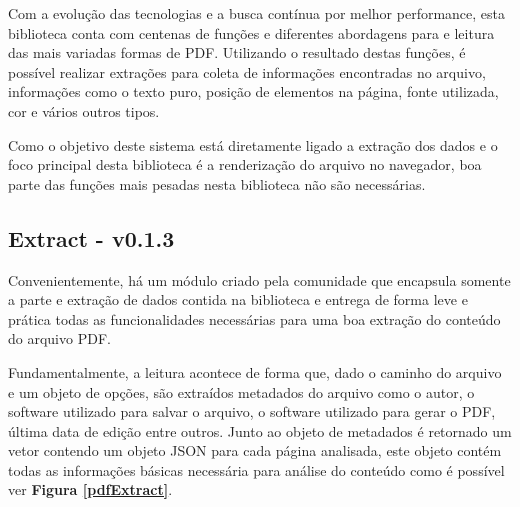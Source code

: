 Com a evolução das tecnologias e a busca contínua por melhor performance, esta biblioteca conta com centenas de funções e diferentes abordagens para e leitura das mais variadas formas de PDF. Utilizando o resultado destas funções, é possível realizar extrações para coleta de informações encontradas no arquivo, informações como o texto puro, posição de elementos na página, fonte utilizada, cor e vários outros tipos.

Como o objetivo deste sistema está diretamente ligado a extração dos dados e o foco principal desta biblioteca é a renderização do arquivo no navegador, boa parte das funções mais pesadas nesta biblioteca não são necessárias.

\subsection{Extract - v0.1.3}
Convenientemente, há um módulo criado pela comunidade que encapsula somente a parte e extração de dados contida na biblioteca e entrega de forma leve e prática todas as funcionalidades necessárias para uma boa extração do conteúdo do arquivo PDF.

Fundamentalmente, a leitura acontece de forma que, dado o caminho do arquivo e um objeto de opções, são extraídos metadados do arquivo como o autor, o software utilizado para salvar o arquivo, o software utilizado para gerar o PDF, última data de edição entre outros. Junto ao objeto de metadados é retornado um vetor contendo um objeto JSON para cada página analisada, este objeto contém todas as informações básicas necessária para análise do conteúdo como é possível ver  \textbf{Figura \ref{pdfExtract}}.

